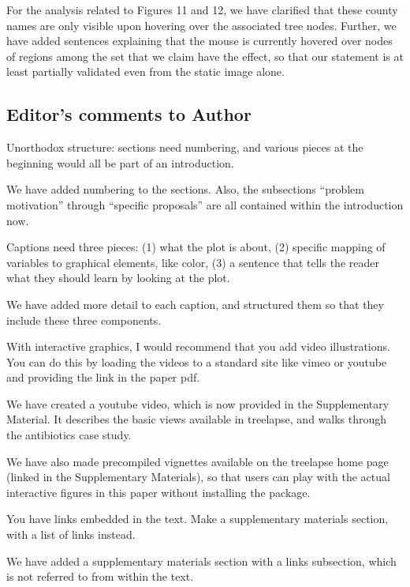 \documentclass{article}
\begin{document}
For the analysis related to Figures 11 and 12, we have clarified that these
county names are only visible upon hovering over the associated tree nodes. Further,
we have added sentences explaining that the mouse is currently hovered over
nodes of regions among the set that we claim have the effect, so that our
statement is at least partially validated even from the static image alone.

\subsection{Editor's comments to Author}

\color{blue}

Unorthodox structure: sections need numbering, and various pieces at the
beginning would all be part of an introduction.

\color{black}
We have added numbering to the sections. Also, the subsections ``problem
motivation'' through ``specific proposals'' are all contained within the
introduction now.

\color{blue}

Captions need three pieces: (1) what the plot is about, (2) specific mapping of
variables to graphical elements, like color, (3) a sentence that tells the
reader what they should learn by looking at the plot.

\color{black}
We have added more detail to each caption, and structured them so that they
include these three components.

\color{blue}

With interactive graphics, I would recommend that you add video illustrations.
You can do this by loading the videos to a standard site like vimeo or youtube
and providing the link in the paper pdf.

\color{black}
We have created a youtube video, which is now provided in the Supplementary
Material. It describes the basic views available in treelapse, and walks through
the antibiotics case study.

We have also made precompiled vignettes available on the treelapse home page
(linked in the Supplementary Materials), so that users can play with the actual
interactive figures in this paper without installing the package.

\color{blue} You have links embedded in the text. Make a supplementary materials
  section, with a list of links instead.

\color{black}
We have added a supplementary materials section with a links subsection, which
is not referred to from within the text.
\end{document}
